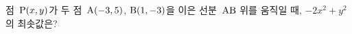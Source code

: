 점~$\mathrm{P}(x{,}\mkern3mu\mathopen{}y)$가 두 점~$\mathrm{A}(-3{,}\mkern3mu\mathopen{}5)$, $\mathrm{B}(1{,}\mkern3mu\mathopen{}-3)$을 이은 선분~$\mathrm{AB}$ 위를 움직일 때, $-2x^2+y^2$의 최솟값은?
